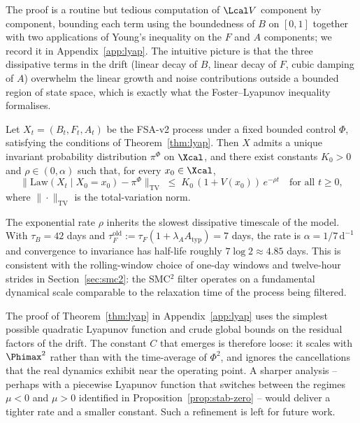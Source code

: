 The proof is a routine but tedious computation of $\Lcal V$ component
by component, bounding each term using the boundedness of $B$ on
$[0,1]$ together with two applications of Young's inequality on the
$F$ and $A$ components; we record it in
Appendix~\ref{app:lyap}. The intuitive picture is that the three
dissipative terms in the drift (linear decay of $B$, linear decay
of $F$, cubic damping of $A$) overwhelm the linear growth and noise
contributions outside a bounded region of state space, which is
exactly what the Foster--Lyapunov inequality formalises.

\begin{theorem}\label{thm:ergodic}
Let $X_t = (B_t,F_t,A_t)$ be the FSA-v2 process under a fixed bounded
control $\Phi$, satisfying the conditions of
Theorem~\ref{thm:lyap}. Then $X$ admits a unique invariant
probability distribution $\pi^\Phi$ on $\Xcal$, and there exist
constants $K_0 > 0$ and $\rho \in (0,\alpha)$ such that, for every
$x_0 \in \Xcal$,
\begin{equation}
  \bigl\| \mathrm{Law}(X_t \mid X_0 = x_0) - \pi^\Phi \bigr\|_{\mathrm{TV}}
   \;\le\; K_0\,(1 + V(x_0))\,e^{-\rho t}
  \quad \text{for all } t \ge 0,
  \label{eq:ergodic-bound}
\end{equation}
where $\|\cdot\|_{\mathrm{TV}}$ is the total-variation norm.
\end{theorem}

The exponential rate $\rho$ inherits the slowest dissipative
timescale of the model. With $\tau_B = 42$ days and
$\tau_F^{\mathrm{old}} := \tau_F(1+\lambda_A A_{\mathrm{typ}}) = 7$ days,
the rate is $\alpha = 1/7\,\mathrm{d}^{-1}$ and convergence to
invariance has half-life roughly $7\log 2 \approx 4.85$ days. This
is consistent with the rolling-window choice of one-day windows
and twelve-hour strides in Section~\ref{sec:smc2}: the
SMC${}^2$ filter operates on a fundamental dynamical scale
comparable to the relaxation time of the process being filtered.

\begin{remark}\label{rem:lyap-limits}
The proof of Theorem~\ref{thm:lyap} in Appendix~\ref{app:lyap} uses
the simplest possible quadratic Lyapunov function and crude global
bounds on the residual factors of the drift. The constant $C$ that
emerges is therefore loose: it scales with $\Phimax^2$ rather than
with the time-average of $\Phi^2$, and ignores the cancellations
that the real dynamics exhibit near the operating point. A sharper
analysis -- perhaps with a piecewise Lyapunov function that
switches between the regimes $\mu < 0$ and $\mu > 0$ identified in
Proposition~\ref{prop:stab-zero} -- would deliver a tighter rate
and a smaller constant. Such a refinement is left for future work.
\end{remark}

